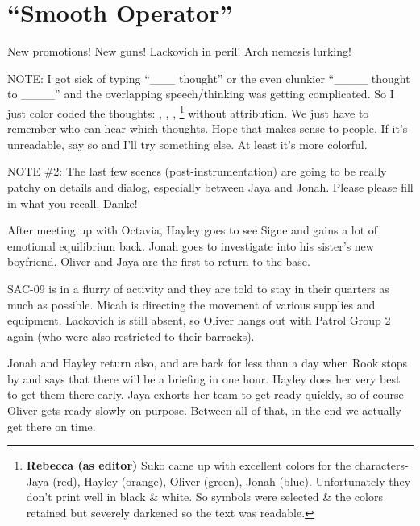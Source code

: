 \setcounter{chapter}{ 19 }
\chapter{\textbf{``Smooth Operator''} }








New promotions!  New guns!  Lackovich in peril!  Arch nemesis lurking!



NOTE: I got sick of typing ``\_\_\_ thought'' or the even clunkier ``\_\_\_\_ thought to \_\_\_\_'' and the overlapping speech/thinking was getting complicated.  So I just color coded the thoughts:  , ,   ,  \footnote{\textbf{Rebecca (as editor) }Suko came up with excellent colors for the characters- Jaya (red), Hayley (orange), Oliver (green), Jonah (blue). Unfortunately they don't print well in black \& white. So symbols were selected \& the colors retained but severely darkened so the text was readable.}
  without attribution.  We just have to remember who can hear which thoughts.  Hope that makes sense to people.  If it's unreadable, say so and I'll try something else.  At least it's more colorful.



NOTE \#2: The last few scenes (post-instrumentation) are going to be really patchy on details and dialog, especially between Jaya and Jonah.  Please please fill in what you recall.  Danke!





After meeting up with Octavia, Hayley goes to see Signe and gains a lot of emotional equilibrium back.  Jonah goes to investigate into his sister's new boyfriend.  Oliver and Jaya are the first to return to the base.



SAC-09 is in a flurry of activity and they are told to stay in their quarters as much as possible.  Micah is directing the movement of various supplies and equipment.  Lackovich is still absent, so Oliver hangs out with Patrol Group 2 again (who were also restricted to their barracks).



Jonah and Hayley return also, and are back for less than a day when Rook stops by and says that there will be a briefing in one hour.  Hayley does her very best to get them there early.   Jaya exhorts her team to get ready quickly, so of course Oliver gets ready slowly on purpose.   Between all of that, in the end we actually get there on time.



